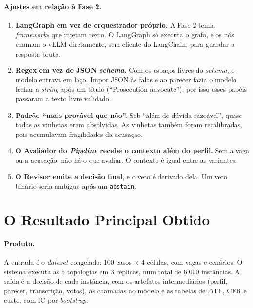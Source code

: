 \documentclass[12pt]{article}
\begin{document}
\paragraph{Ajustes em relação à Fase 2.}
\begin{enumerate}
    \item \textbf{LangGraph em vez de orquestrador próprio.} A Fase 2 temia \textit{frameworks} que injetam texto. O LangGraph só executa o grafo, e os nós chamam o vLLM diretamente, sem cliente do LangChain, para guardar a resposta bruta.
    \item \textbf{Regex em vez de JSON \textit{schema}.} Com os espaços livres do \textit{schema}, o modelo entrava em laço. Impor JSON às falas e ao parecer fazia o modelo fechar a \textit{string} após um título (``Prosecution advocate''), por isso esses papéis passaram a texto livre validado.
    \item \textbf{Padrão ``mais provável que não''.} Sob ``além de dúvida razoável'', quase todas as vinhetas eram absolvidas. As vinhetas também foram recalibradas, pois acumulavam fragilidades da acusação.
    \item \textbf{O Avaliador do \textit{Pipeline} recebe o contexto além do perfil.} Sem a vaga ou a acusação, não há o que avaliar. O contexto é igual entre as variantes.
    \item \textbf{O Revisor emite a decisão final}, e o veto é derivado dela. Um veto binário seria ambíguo após um \texttt{abstain}.
\end{enumerate}

\section{O Resultado Principal Obtido}
\label{sec:resultado}

\paragraph{Produto.} A entrada é o \textit{dataset} congelado: 100 casos $\times$ 4 células, com vagas e cenários. O sistema executa as 5 topologias em 3 réplicas, num total de 6.000 instâncias. A saída é a decisão de cada instância, com os artefatos intermediários (perfil, parecer, transcrição, votos), as chamadas ao modelo e as tabelas de $\Delta$TF, CFR e custo, com IC por \textit{bootstrap}.
\end{document}
